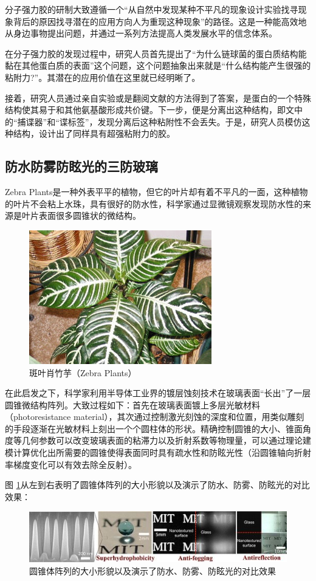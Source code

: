 \documentclass[UTF8,9pt]{ctexart}
\newcommand\sub{\subsection}                                           %
\begin{document}
分子强力胶的研制大致遵循一个``从自然中发现某种不平凡的现象\ce{->}设计实验找寻现象背后的原因\ce{->}找寻潜在的应用方向\ce{->}人为重现这种现象''的路径。这是一种能高效地从身边事物提出问题，并通过一系列方法提高人类发展水平的信念体系。

在分子强力胶的发现过程中，研究人员首先提出了``为什么链球菌的蛋白质结构能黏在其他蛋白质的表面''这个问题，这个问题抽象出来就是``什么结构能产生很强的粘附力?''。其潜在的应用价值在这里就已经明晰了。

接着，研究人员通过亲自实验或是翻阅文献的方法得到了答案，是蛋白的一个特殊结构使其易于和其他氨基酸形成共价键。下一步，便是分离出这种结构，即文中的“捕谍器”和“谍标签”，发现分离后这种粘附性不会丢失。于是，研究人员模仿这种结构，设计出了同样具有超强粘附力的胶。
\sub{防水防雾防眩光的三防玻璃}
Zebra Plants是一种外表平平的植物，但它的叶片却有着不平凡的一面，这种植物的叶片不会粘上水珠，具有很好的防水性，科学家通过显微镜观察发现防水性的来源是叶片表面很多圆锥状的微结构。

\begin{figure}[htbp]
    \centering
    \includegraphics[scale=0.5]{21.jpg}
    \caption{斑叶肖竹芋（Zebra Plants）}
\end{figure}

在此启发之下，科学家利用半导体工业界的镀层蚀刻技术在玻璃表面“长出”了一层圆锥微结构阵列。大致过程如下：首先在玻璃表面镀上多层光敏材料（photoresistance material），其次通过控制激光刻蚀的深度和位置，用类似雕刻的手段逐渐在光敏材料上刻出一个个圆柱体的形状。精确控制圆锥的大小、锥面角度等几何参数可以改变玻璃表面的粘滞力以及折射系数等物理量，可以通过理论建模计算优化出所需要的圆锥使得表面同时具有疏水性和防眩光性（沿圆锥轴向折射率梯度变化可以有效去除全反射）。

图 \ref{sfbl}从左到右表明了圆锥体阵列的大小形貌以及演示了防水、防雾、防眩光的对比效果： 

\begin{figure}[htbp]
    \centering
    \includegraphics[scale=0.5]{22.jpg}
    \caption{圆锥体阵列的大小形貌以及演示了防水、防雾、防眩光的对比效果}
    \label{sfbl}
\end{figure}
\end{document}

